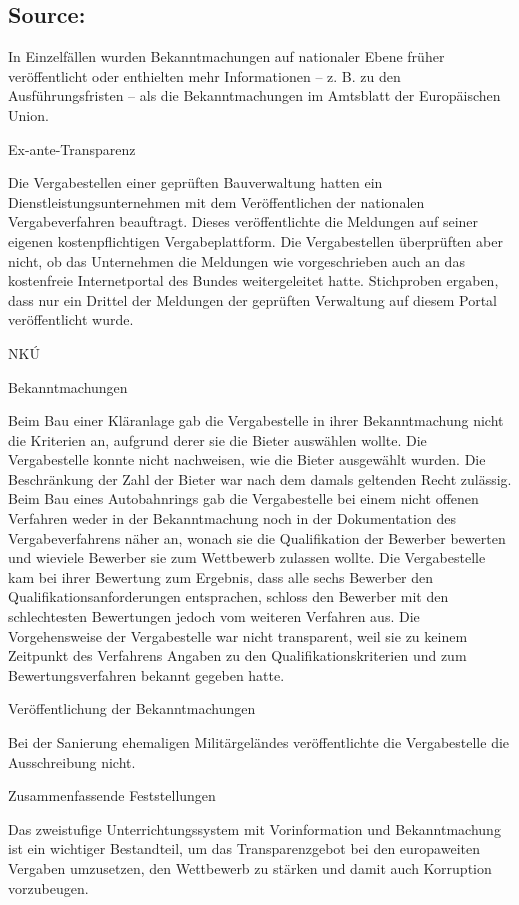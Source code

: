 \documentclass[10pt]{article}
\begin{document}
\subsection*{Source:}

In Einzelfällen wurden Bekanntmachungen auf nationaler Ebene früher veröffentlicht oder enthielten mehr Informationen – z. B. zu den Ausführungsfristen – als die Bekanntmachungen im Amtsblatt der Europäischen Union.


Ex-ante-Transparenz

Die Vergabestellen einer geprüften Bauverwaltung hatten ein Dienstleistungsunternehmen mit dem Veröffentlichen der nationalen Vergabeverfahren beauftragt.
Dieses veröffentlichte die Meldungen auf seiner eigenen kostenpflichtigen Vergabeplattform.
Die Vergabestellen überprüften aber nicht, ob das Unternehmen die Meldungen wie vorgeschrieben auch an das kostenfreie Internetportal des Bundes weitergeleitet hatte.
Stichproben ergaben, dass nur ein Drittel der Meldungen der geprüften Verwaltung auf diesem Portal veröffentlicht wurde.


NKÚ



Bekanntmachungen

Beim Bau einer Kläranlage gab die Vergabestelle in ihrer Bekanntmachung nicht die Kriterien an, aufgrund derer sie die Bieter auswählen wollte.
Die Vergabestelle konnte nicht nachweisen, wie die Bieter ausgewählt wurden.
Die Beschränkung der Zahl der Bieter war nach dem damals geltenden Recht zulässig.
Beim Bau eines Autobahnrings gab die Vergabestelle bei einem nicht offenen Verfahren weder in der Bekanntmachung noch in der Dokumentation des Vergabeverfahrens näher an, wonach sie die Qualifikation der Bewerber bewerten und wieviele Bewerber sie zum Wettbewerb zulassen wollte.
Die Vergabestelle kam bei ihrer Bewertung zum Ergebnis, dass alle sechs Bewerber den Qualifikationsanforderungen entsprachen, schloss den Bewerber mit den schlechtesten Bewertungen jedoch vom weiteren Verfahren aus.
Die Vorgehensweise der Vergabestelle war nicht transparent, weil sie zu keinem Zeitpunkt des Verfahrens Angaben zu den Qualifikationskriterien und zum Bewertungsverfahren bekannt gegeben hatte.


Veröffentlichung der Bekanntmachungen

Bei der Sanierung ehemaligen Militärgeländes veröffentlichte die Vergabestelle die Ausschreibung nicht.


Zusammenfassende Feststellungen

Das zweistufige Unterrichtungssystem mit Vorinformation und Bekanntmachung ist ein wichtiger Bestandteil, um das Transparenzgebot bei den europaweiten Vergaben umzusetzen, den Wettbewerb zu stärken und damit auch Korruption vorzubeugen.
\end{document}

